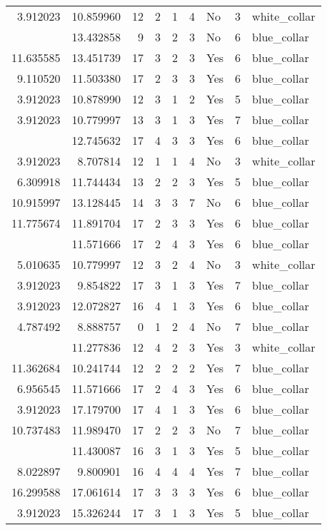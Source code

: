 \documentclass[
]{article}
\begin{document}
\begin{longtable}[t]{rrrrrllrl}
3.912023 & 10.859960 & 12 & 2 & 1 & 4 & No & 3 & white\_collar\\
\addlinespace
11.918724 & 13.432858 & 9 & 3 & 2 & 3 & No & 6 & blue\_collar\\
11.635585 & 13.451739 & 17 & 3 & 2 & 3 & Yes & 6 & blue\_collar\\
9.110520 & 11.503380 & 17 & 2 & 3 & 3 & Yes & 6 & blue\_collar\\
3.912023 & 10.878990 & 12 & 3 & 1 & 2 & Yes & 5 & blue\_collar\\
3.912023 & 10.779997 & 13 & 3 & 1 & 3 & Yes & 7 & blue\_collar\\
\addlinespace
13.997874 & 12.745632 & 17 & 4 & 3 & 3 & Yes & 6 & blue\_collar\\
3.912023 & 8.707814 & 12 & 1 & 1 & 4 & No & 3 & white\_collar\\
6.309918 & 11.744434 & 13 & 2 & 2 & 3 & Yes & 5 & blue\_collar\\
10.915997 & 13.128445 & 14 & 3 & 3 & 7 & No & 6 & blue\_collar\\
11.775674 & 11.891704 & 17 & 2 & 3 & 3 & Yes & 6 & blue\_collar\\
\addlinespace
6.956545 & 11.571666 & 17 & 2 & 4 & 3 & Yes & 6 & blue\_collar\\
5.010635 & 10.779997 & 12 & 3 & 2 & 4 & No & 3 & white\_collar\\
3.912023 & 9.854822 & 17 & 3 & 1 & 3 & Yes & 7 & blue\_collar\\
3.912023 & 12.072827 & 16 & 4 & 1 & 3 & Yes & 6 & blue\_collar\\
4.787492 & 8.888757 & 0 & 1 & 2 & 4 & No & 7 & blue\_collar\\
\addlinespace
5.010635 & 11.277836 & 12 & 4 & 2 & 3 & Yes & 3 & white\_collar\\
11.362684 & 10.241744 & 12 & 2 & 2 & 2 & Yes & 7 & blue\_collar\\
6.956545 & 11.571666 & 17 & 2 & 4 & 3 & Yes & 6 & blue\_collar\\
3.912023 & 17.179700 & 17 & 4 & 1 & 3 & Yes & 6 & blue\_collar\\
10.737483 & 11.989470 & 17 & 2 & 2 & 3 & No & 7 & blue\_collar\\
\addlinespace
3.912023 & 11.430087 & 16 & 3 & 1 & 3 & Yes & 5 & blue\_collar\\
8.022897 & 9.800901 & 16 & 4 & 4 & 4 & Yes & 7 & blue\_collar\\
16.299588 & 17.061614 & 17 & 3 & 3 & 3 & Yes & 6 & blue\_collar\\
3.912023 & 15.326244 & 17 & 3 & 1 & 3 & Yes & 5 & blue\_collar\\

\end{longtable}
\end{document}
